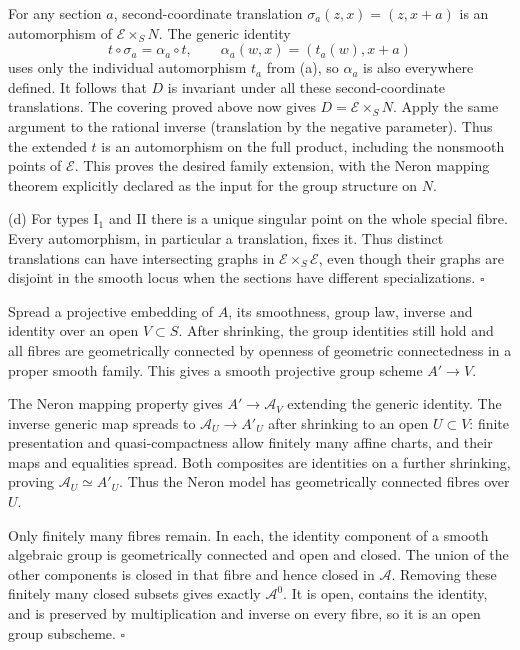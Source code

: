 \documentclass[11pt]{article}
\let\chapterexercise\exercise
\renewcommand{\exercise}[2]{\Needspace{8\baselineskip}\chapterexercise{#1}{#2}}
\begin{document}
For any section $a$, second-coordinate translation $\sigma_a(z,x)=(z,x+a)$ is an automorphism of $\mathcal E\times_SN$. The generic identity
\[ t\circ\sigma_a=\alpha_a\circ t,\qquad
\alpha_a(w,x)=(t_a(w),x+a) \]
uses only the individual automorphism $t_a$ from (a), so $\alpha_a$ is also everywhere defined. It follows that $D$ is invariant under all these second-coordinate translations. The covering proved above now gives $D=\mathcal E\times_SN$. Apply the same argument to the rational inverse (translation by the negative parameter). Thus the extended $t$ is an automorphism on the full product, including the nonsmooth points of $\mathcal E$. This proves the desired family extension, with the Neron mapping theorem explicitly declared as the input for the group structure on $N$.

(d) For types $\mathrm I_1$ and II there is a unique singular point on the whole special fibre. Every automorphism, in particular a translation, fixes it. Thus distinct translations can have intersecting graphs in $\mathcal E\times_S\mathcal E$, even though their graphs are disjoint in the smooth locus when the sections have different specializations. \hfill$\square$

\pf Spread a projective embedding of $A$, its smoothness, group law, inverse and identity over an open $V\subset S$. After shrinking, the group identities still hold and all fibres are geometrically connected by openness of geometric connectedness in a proper smooth family. This gives a smooth projective group scheme $A'\to V$.

The Neron mapping property gives $A'\to\mathcal A_V$ extending the generic identity. The inverse generic map spreads to $\mathcal A_U\to A'_U$ after shrinking to an open $U\subset V$: finite presentation and quasi-compactness allow finitely many affine charts, and their maps and equalities spread. Both composites are identities on a further shrinking, proving $\mathcal A_U\simeq A'_U$. Thus the Neron model has geometrically connected fibres over $U$.

Only finitely many fibres remain. In each, the identity component of a smooth algebraic group is geometrically connected and open and closed. The union of the other components is closed in that fibre and hence closed in $\mathcal A$. Removing these finitely many closed subsets gives exactly $\mathcal A^0$. It is open, contains the identity, and is preserved by multiplication and inverse on every fibre, so it is an open group subscheme. \hfill$\square$
\end{document}
